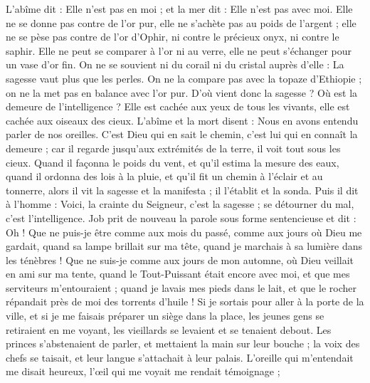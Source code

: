 \begin{multicols}{2}
L'abîme dit : Elle n'est pas en moi ; et la mer dit : Elle n'est pas avec moi.
Elle ne se donne pas contre de l'or pur, elle ne s'achète pas au poids de l'argent ;
elle ne se pèse pas contre de l'or d'Ophir, ni contre le précieux onyx, ni contre le saphir.
Elle ne peut se comparer à l'or ni au verre, elle ne peut s'échanger pour un vase d'or fin.
On ne se souvient ni du corail ni du cristal auprès d'elle : La sagesse vaut plus que les perles.
On ne la compare pas avec la topaze d'Ethiopie ; on ne la met pas en balance avec l'or pur.
D'où vient donc la sagesse ? Où est la demeure de l'intelligence ?
Elle est cachée aux yeux de tous les vivants, elle est cachée aux oiseaux des cieux.
L'abîme et la mort disent : Nous en avons entendu parler de nos oreilles.
C'est Dieu qui en sait le chemin, c'est lui qui en connaît la demeure ;
car il regarde jusqu'aux extrémités de la terre, il voit tout sous les cieux.
Quand il façonna le poids du vent, et qu'il estima la mesure des eaux,
quand il ordonna des lois à la pluie, et qu'il fit un chemin à l'éclair et au tonnerre,
alors il vit la sagesse et la manifesta ; il l'établit et la sonda.
Puis il dit à l'homme : Voici, la crainte du Seigneur, c'est la sagesse ; se détourner du mal, c'est l'intelligence.
\VerseOne{}Job prit de nouveau la parole sous forme sentencieuse et dit :
Oh ! Que ne puis-je être comme aux mois du passé, comme aux jours où Dieu me gardait,
quand sa lampe brillait sur ma tête, quand je marchais à sa lumière dans les ténèbres !
Que ne suis-je comme aux jours de mon automne, où Dieu veillait en ami sur ma tente,
quand le Tout-Puissant était encore avec moi, et que mes serviteurs m'entouraient ;
quand je lavais mes pieds dans le lait, et que le rocher répandait près de moi des torrents d'huile !
Si je sortais pour aller à la porte de la ville, et si je me faisais préparer un siège dans la place,
les jeunes gens se retiraient en me voyant, les vieillards se levaient et se tenaient debout.
Les princes s'abstenaient de parler, et mettaient la main sur leur bouche ;
la voix des chefs se taisait, et leur langue s'attachait à leur palais.
L'oreille qui m'entendait me disait heureux, l'œil qui me voyait me rendait témoignage ;

\end{multicols}
